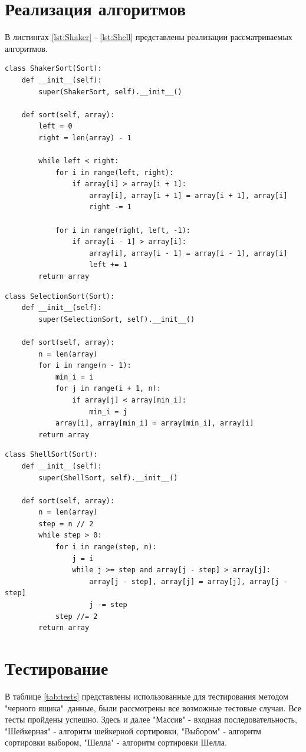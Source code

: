 \documentclass[a4paper,oneside,14pt]{extreport}
\begin{document}
\section{Реализация алгоритмов}
В листингах \ref{lst:Shaker} - \ref{lst:Shell} представлены реализации рассматриваемых алгоритмов.
\newpage
\captionsetup{singlelinecheck=false, justification=raggedright}
\begin{lstlisting}[caption=Шейкерная сортировка, label={lst:Shaker}]
class ShakerSort(Sort):
	def __init__(self):
		super(ShakerSort, self).__init__()
	
	def sort(self, array):
		left = 0
		right = len(array) - 1
		
		while left < right:
			for i in range(left, right):
				if array[i] > array[i + 1]:
					array[i], array[i + 1] = array[i + 1], array[i]
					right -= 1
			
			for i in range(right, left, -1):
				if array[i - 1] > array[i]:
					array[i], array[i - 1] = array[i - 1], array[i]
					left += 1
		return array
\end{lstlisting}

\begin{lstlisting}[caption=Сортировка выбором, label={lst:Select}]
class SelectionSort(Sort):
	def __init__(self):
		super(SelectionSort, self).__init__()
	
	def sort(self, array):
		n = len(array)
		for i in range(n - 1):
			min_i = i
			for j in range(i + 1, n):
				if array[j] < array[min_i]:
					min_i = j
			array[i], array[min_i] = array[min_i], array[i]
		return array
\end{lstlisting}
\newpage
\begin{lstlisting}[caption=Сортировка Шелла, label={lst:Shell}]
class ShellSort(Sort):
	def __init__(self):
		super(ShellSort, self).__init__()
		
	def sort(self, array):
		n = len(array)
		step = n // 2
		while step > 0:
			for i in range(step, n):
				j = i
				while j >= step and array[j - step] > array[j]:
					array[j - step], array[j] = array[j], array[j - step]
					j -= step
			step //= 2
		return array
\end{lstlisting}

\section{Тестирование}
В таблице \ref{tab:tests} представлены использованные для тестирования методом "черного ящика"\ данные, были рассмотрены все возможные тестовые случаи. Все тесты пройдены успешно. Здесь и далее "Массив" - входная последовательность, "Шейкерная" - алгоритм шейкерной сортировки, "Выбором" - алгоритм сортировки выбором, "Шелла" - алгоритм сортировки Шелла.
\end{document}
